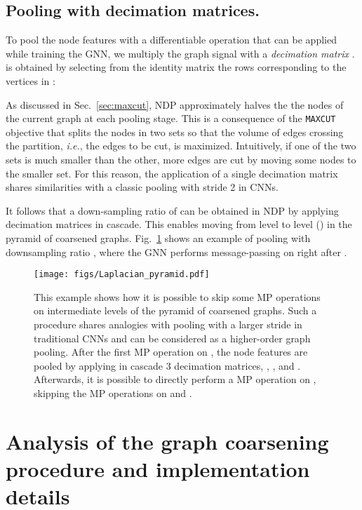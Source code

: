 \documentclass[journal]{IEEEtran}
\newcommand{\maxcut}{\texttt{\small{MAXCUT}}}
\begin{document}
\subsection{Pooling with decimation matrices.}
\label{sec:pooling_matrices}

To pool the node features with a differentiable operation that can be applied while training the GNN, we multiply the graph signal  with a \textit{decimation matrix} .
 is obtained by selecting from the identity matrix  the rows corresponding to the vertices in :


As discussed in Sec.~\ref{sec:maxcut}, NDP approximately halves the the nodes of the current graph at each pooling stage.
This is a consequence of the \maxcut{} objective that splits the nodes in two sets so that the volume of edges crossing the partition, \textit{i.e.}, the edges to be cut, is maximized.
Intuitively, if one of the two sets is much smaller than the other, more edges are cut by moving some nodes to the smaller set.
For this reason, the application of a single decimation matrix  shares similarities with a classic pooling with stride 2 in CNNs.

It follows that a down-sampling ratio of  can be obtained in NDP by applying  decimation matrices in cascade.
This enables moving from level  to level  () in the pyramid of coarsened graphs.
Fig.~\ref{fig:lap_pyramid} shows an example of pooling with downsampling ratio , where the GNN performs message-passing on  right after .
\begin{figure}[!ht]
    \centering
    \texttt{[image: figs/Laplacian\_pyramid.pdf]}    
    \caption{This example shows how it is possible to skip some MP operations on intermediate levels of the pyramid of coarsened graphs. 
    Such a procedure shares analogies with pooling with a larger stride in traditional CNNs and can be considered as a higher-order graph pooling.
    After the first MP operation on , the node features are pooled by applying in cascade 3 decimation matrices, , , and .
    Afterwards, it is possible to directly perform a MP operation on , skipping the MP operations on  and .}
    \label{fig:lap_pyramid}
\end{figure}

\section{Analysis of the graph coarsening procedure and implementation details}
\label{sec:analysis}
\end{document}
